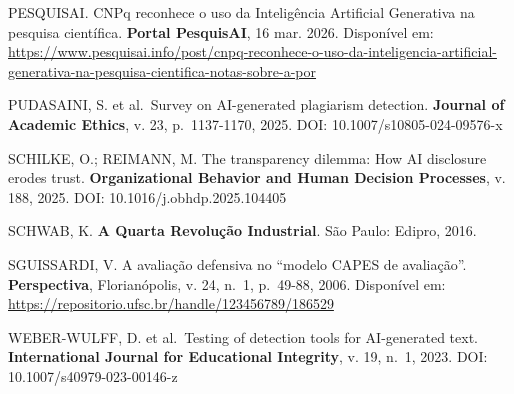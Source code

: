 \documentclass[
  12pt,
  a4paper,
  brazil,
  twoside
]{report}
\begin{document}
PESQUISAI. CNPq reconhece o uso da Inteligência Artificial Generativa na
pesquisa científica. \textbf{Portal PesquisAI}, 16 mar. 2026. Disponível
em:
\url{https://www.pesquisai.info/post/cnpq-reconhece-o-uso-da-inteligencia-artificial-generativa-na-pesquisa-cientifica-notas-sobre-a-por}

PUDASAINI, S. et al.~Survey on AI-generated plagiarism detection.
\textbf{Journal of Academic Ethics}, v. 23, p.~1137-1170, 2025. DOI:
10.1007/s10805-024-09576-x

SCHILKE, O.; REIMANN, M. The transparency dilemma: How AI disclosure
erodes trust. \textbf{Organizational Behavior and Human Decision
Processes}, v. 188, 2025. DOI: 10.1016/j.obhdp.2025.104405

SCHWAB, K. \textbf{A Quarta Revolução Industrial}. São Paulo: Edipro,
2016.

SGUISSARDI, V. A avaliação defensiva no ``modelo CAPES de avaliação''.
\textbf{Perspectiva}, Florianópolis, v. 24, n.~1, p.~49-88, 2006.
Disponível em: \url{https://repositorio.ufsc.br/handle/123456789/186529}

WEBER-WULFF, D. et al.~Testing of detection tools for AI-generated text.
\textbf{International Journal for Educational Integrity}, v. 19, n.~1,
2023. DOI: 10.1007/s40979-023-00146-z
\end{document}
